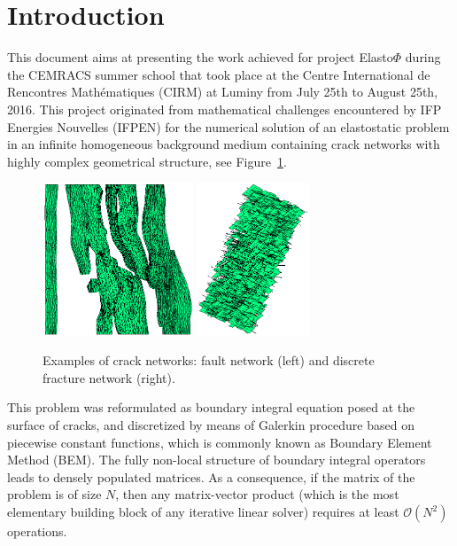 

\section*{Introduction}

This document aims at presenting the work achieved for project Elasto$\Phi$ during the CEMRACS summer school  
that took place at the Centre International de Rencontres Math\'ematiques (CIRM) at Luminy from July 25th to 
August 25th, 2016. This project originated from mathematical challenges encountered by IFP Energies Nouvelles (IFPEN)
for the numerical solution of an elastostatic problem in an infinite homogeneous background medium containing crack 
networks with highly complex geometrical structure, see Figure~\ref{fig:structureExamples}. 

\begin{figure}[hb]
\centering
\includegraphics[width=0.4\textwidth]{../images/visu_maillage5364FracsTriangles.png} \quad
\includegraphics[width=0.3\textwidth]{../images/visu_maillage1994Fracs.png}
\caption{Examples of crack networks: fault network (left) and discrete fracture network (right).}
\label{fig:structureExamples}
\end{figure}

\bigskip
This problem was reformulated as boundary integral equation posed at the surface of cracks, and 
discretized by means of Galerkin procedure based on piecewise constant functions, which is commonly known as 
Boundary Element Method (BEM). The fully non-local structure of boundary integral operators leads to  
densely populated matrices. As a consequence, if the matrix of the problem is of size $N$, 
then any matrix-vector product (which is the most elementary building block of any iterative linear solver)
requires at least $\mathcal{O}(N^{2})$ operations.

